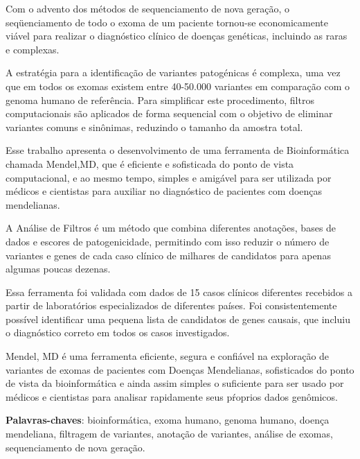 \documentclass[
	12pt,				%
	openany,			%
	oneside,			%
	a4paper,			%
	english,			%
	brazil,				%
	]{abntex2}
\begin{document}
\begin{resumo}

Com o advento dos métodos de sequenciamento de nova geração, o seqüenciamento de todo o exoma de um paciente tornou-se economicamente viável para realizar o diagnóstico clínico de doenças genéticas, incluindo as raras e complexas. 

A estratégia para a identificação de variantes patogénicas é complexa, uma vez que em todos os exomas existem entre 40-50.000 variantes em comparação com o genoma humano de referência. Para simplificar este procedimento, filtros computacionais são aplicados de forma sequencial com o objetivo de eliminar variantes comuns e sinônimas, reduzindo o tamanho da amostra total. 

Esse trabalho apresenta o desenvolvimento de uma ferramenta de Bioinformática chamada Mendel,MD, que é eficiente e sofisticada do ponto de vista computacional, e ao mesmo tempo, simples e amigável para ser utilizada por médicos e cientistas para auxiliar no diagnóstico de pacientes com doenças mendelianas.

A Análise de Filtros é um método que combina diferentes anotações, bases de dados e escores de patogenicidade, permitindo com isso reduzir o número de variantes e genes de cada caso clínico de milhares de candidatos para apenas algumas poucas dezenas.

Essa ferramenta foi validada com dados de 15 casos clínicos diferentes recebidos a partir de laboratórios especializados de diferentes países. Foi consistentemente possível identificar uma pequena lista de candidatos de genes causais, que incluiu o diagnóstico correto em todos os casos investigados.

Mendel, MD é uma ferramenta eficiente, segura e confiável na exploração de variantes de exomas de pacientes com Doenças Mendelianas, sofisticados do ponto de vista da bioinformática e ainda assim simples o suficiente para ser usado por médicos e cientistas para analisar rapidamente seus pŕoprios dados genômicos.

 \vspace{\onelineskip}
 \noindent
 \textbf{Palavras-chaves}: bioinformática, exoma humano, genoma humano, doença mendeliana, filtragem de variantes, anotação de variantes, análise de exomas, sequenciamento de nova geração.
\end{resumo}

% 
\end{document}

